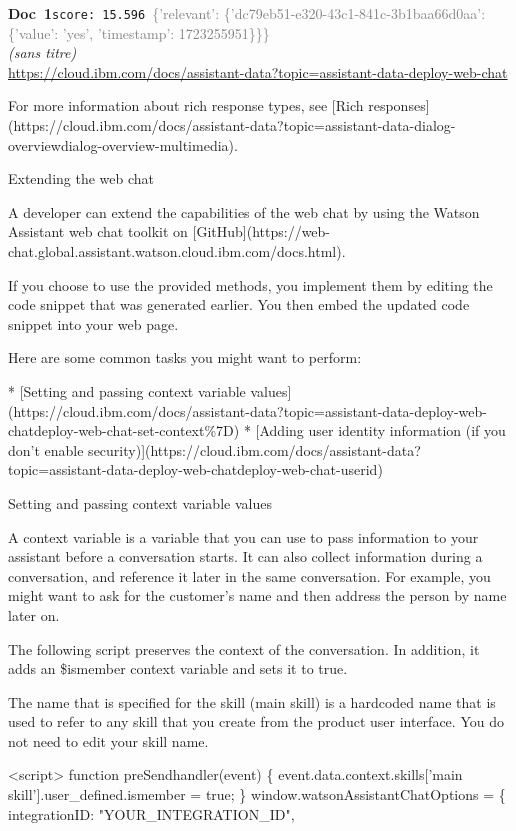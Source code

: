 \documentclass[a4paper,11pt]{article}
\begin{document}
\begin{docenv}
{\footnotesize\textcolor{doccolor}{\textbf{Doc~1}}}\hfill{\tiny\texttt{score:~15.596}}\ {\tiny\textcolor{gray}{\{'relevant': \{'dc79eb51-e320-43c1-841c-3b1baa66d0aa': \{'value': 'yes', 'timestamp': 1723255951\}\}\}}}\\[3pt]
{\small\textit{(sans titre)}}\\[2pt]
{\tiny\url{https://cloud.ibm.com/docs/assistant-data?topic=assistant-data-deploy-web-chat}}\\[4pt]
{\footnotesize 
For more information about rich response types, see [Rich responses](https://cloud.ibm.com/docs/assistant-data?topic=assistant-data-dialog-overviewdialog-overview-multimedia).





 Extending the web chat 

A developer can extend the capabilities of the web chat by using the Watson Assistant web chat toolkit on [GitHub](https://web-chat.global.assistant.watson.cloud.ibm.com/docs.html).

If you choose to use the provided methods, you implement them by editing the code snippet that was generated earlier. You then embed the updated code snippet into your web page.

Here are some common tasks you might want to perform:



* [Setting and passing context variable values](https://cloud.ibm.com/docs/assistant-data?topic=assistant-data-deploy-web-chatdeploy-web-chat-set-context\%7D)
* [Adding user identity information (if you don't enable security)](https://cloud.ibm.com/docs/assistant-data?topic=assistant-data-deploy-web-chatdeploy-web-chat-userid)





 Setting and passing context variable values 

A context variable is a variable that you can use to pass information to your assistant before a conversation starts. It can also collect information during a conversation, and reference it later in the same conversation. For example, you might want to ask for the customer's name and then address the person by name later on.

The following script preserves the context of the conversation. In addition, it adds an \$ismember context variable and sets it to true.

The name that is specified for the skill (main skill) is a hardcoded name that is used to refer to any skill that you create from the product user interface. You do not need to edit your skill name.

<script>
function preSendhandler(event) \{
event.data.context.skills['main skill'].user\_defined.ismember = true;
\}
window.watsonAssistantChatOptions = \{
integrationID: "YOUR\_INTEGRATION\_ID",}
\end{docenv}
\end{document}
